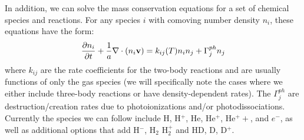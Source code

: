 In addition, we can solve the mass conservation equations for a set of chemical species and reactions.  For any species $i$ with comoving number density $n_i$, these equations have the form:
\begin{equation}
\frac{\partial n_i}{\partial t} 
          + \frac{1}{a} \nabla \cdot (n_i \vecv) = 
        k_{ij}(T) n_i n_j 
      + \Gamma^{ph}_j n_j 
        \label{eq:species_evolution}
\end{equation}
where $k_{ij}$ are the rate coefficients for the two-body reactions and are usually functions of only the gas species (we will specifically note the cases where we either include three-body reactions or have density-dependent rates).  The $\Gamma^{ph}_j$ are destruction/creation rates due to photoionizations and/or photodissociations.  Currently the species we can follow include H, H$^+$, He, He$^+$, He$^++$, and $e^-$, as well as additional options that add H$^-$, H$_2$ H$_2^+$ and  HD, D, D$^+$.



%



